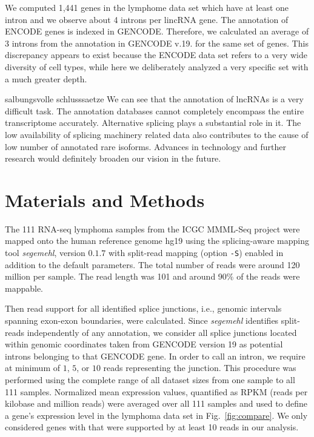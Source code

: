 \documentclass[ncrna,article,submit,moreauthors,pdftex,10pt,a4paper]{mdpi}
\newcommand{\TODO}[1]{\begingroup\color{red}#1\endgroup}
\begin{document}
We computed 1,441 genes in the lymphome data set which have at least one intron and we observe about 4 introns per lincRNA gene. The annotation of ENCODE genes is indexed in GENCODE. Therefore, we calculated an average of 3 introns from the annotation in GENCODE v.19. for the same set of genes. This discrepancy appears to exist because the ENCODE data set refers to a very wide diversity of cell types, while here we deliberately analyzed a very specific set with a much greater depth. 

\TODO{salbungsvolle schlusssaetze} 
We can see that the annotation of lncRNAs is a very difficult task. The annotation databases cannot completely encompass the entire transcriptome accurately. Alternative splicing plays a substantial role in it. The low availability of splicing machinery related data also contributes to the cause of low number of annotated rare isoforms. Advances in technology and further research would definitely broaden our vision in the future.

\section{Materials and Methods}

The 111 RNA-seq lymphoma samples from the ICGC MMML-Seq project
\cite{Richter:12a} were mapped onto the human reference genome
hg19 using the splicing-aware mapping tool \textit{segemehl},
version $0.1.7$ \cite{Hoffmann:09a,Hoffmann:14a} with split-read mapping
(option \texttt{-S}) enabled in addition to the default parameters. The total number of reads were around 120 million per sample. The read length was 101 and around 90\% of the reads were mappable.

Then read support for all identified splice junctions, i.e., genomic
intervals spanning exon-exon boundaries, were calculated. Since
\textit{segemehl} identifies split-reads independently of any annotation,
we consider all splice junctions located within genomic coordinates taken
from GENCODE version 19 as potential introns belonging to that GENCODE
gene. In order to call an intron, we require at minimum of $1$, $5$, or
$10$ reads representing the junction.  This procedure was performed using
the complete range of all dataset sizes from one sample to all 111 samples.
Normalized mean expression values, quantified as RPKM (reads per kilobase
and million reads) were averaged over all 111 samples and used to define a
gene's expression level in the lymphoma data set in Fig.\
\ref{fig:compare}. We only considered genes with that were supported by at
least 10 reads in our analysis.
\end{document}
